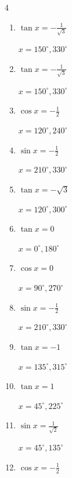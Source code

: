 \begin{multicols}{4}
\begin{enumerate}
        $\displaystyle x = 135^{\circ} , 225^{\circ}$

  \item $\displaystyle \tan{x}  = -\frac{1}{\sqrt{3}}$

        $\displaystyle x = 150^{\circ} , 330^{\circ}$

  \item $\displaystyle \tan{x}  = -\frac{1}{\sqrt{3}}$

        $\displaystyle x = 150^{\circ} , 330^{\circ}$

  \item $\displaystyle \cos{x}  = -\frac{1}{2}$

        $\displaystyle x = 120^{\circ} , 240^{\circ}$

  \item $\displaystyle \sin{x}  = -\frac{1}{2}$

        $\displaystyle x = 210^{\circ} , 330^{\circ}$

  \item $\displaystyle \tan{x}  = -\sqrt{3}$

        $\displaystyle x = 120^{\circ} , 300^{\circ}$

  \item $\displaystyle \tan{x}  = 0$

        $\displaystyle x = 0^{\circ} , 180^{\circ}$

  \item $\displaystyle \cos{x}  = 0$

        $\displaystyle x = 90^{\circ} , 270^{\circ}$

  \item $\displaystyle \sin{x}  = -\frac{1}{2}$

        $\displaystyle x = 210^{\circ} , 330^{\circ}$

  \item $\displaystyle \tan{x}  = -1$

        $\displaystyle x = 135^{\circ} , 315^{\circ}$

\columnbreak %

  \item $\displaystyle \tan{x}  = 1$

        $\displaystyle x = 45^{\circ} , 225^{\circ}$

  \item $\displaystyle \sin{x}  = \frac{1}{\sqrt{2}}$

        $\displaystyle x = 45^{\circ} , 135^{\circ}$

  \item $\displaystyle \cos{x}  = -\frac{1}{2}$


\end{enumerate}
\end{multicols}
